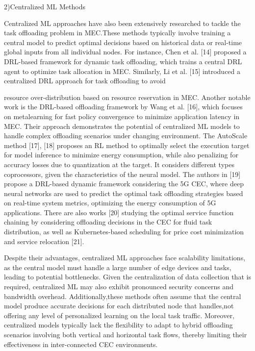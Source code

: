 \documentclass{article}
\begin{document}
2)Centralized ML Methods

Centralized ML approaches have also been extensively researched to tackle the task offloading problem in MEC.These methods typically involve training a central model to predict optimal decisions based on historical data or real-time global inputs from all individual nodes. For instance, Chen et al. [14] proposed a DRL-based framework for dynamic task offloading, which trains a central DRL agent to optimize task allocation in MEC. Similarly, Li et al. [15] introduced a centralized DRL approach for task offloading to avoid

resource over-distribution based on resource reservation in MEC. Another notable work is the DRL-based offloading framework by Wang et al. [16], which focuses on metalearning for fast policy convergence to minimize application latency in MEC. Their approach demonstrates the potential of centralized ML models to handle complex offloading scenarios under changing environment. The AutoScale method [17], [18] proposes an RL method to optimally select the execution target for model inference to minimize energy consumption, while also penalizing for accuracy losses due to quantization at the target. It considers different types coprocessors, given the characteristics of the neural model. The authors in [19] propose a DRL-based dynamic framework considering the 5G CEC, where deep neural networks are used to predict the optimal task offloading strategies based on real-time system metrics, optimizing the energy consumption of 5G applications. There are also works [20] studying the optimal service function chaining by considering offloading decisions in the CEC for fluid task distribution, as well as Kubernetes-based scheduling for price cost minimization and service relocation [21].

Despite their advantages, centralized ML approaches face scalability limitations, as the central model must handle a large number of edge devices and tasks, leading to potential bottlenecks. Given the centralization of data collection that is required, centralized ML may also exhibit pronounced security concerns and bandwidth overhead. Additionally,these methods often assume that the central model produce accurate decisions for each distributed node that handles,not offering any level of personalized learning on the local task traffic. Moreover, centralized models typically lack the flexibility to adapt to hybrid offloading scenarios involving both vertical and horizontal task flows, thereby limiting their effectiveness in inter-connected CEC environments.
\end{document}
